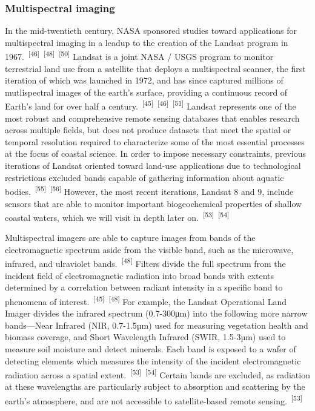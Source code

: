 \documentclass{article}
\begin{document}
\subsubsection{Multispectral imaging}


\par{In the mid-twentieth century, NASA sponsored studies toward applications for multispectral imaging in a leadup to the creation of the Landsat program in 1967.~\textsuperscript{[46]}~\textsuperscript{[48]}~\textsuperscript{[50]} Landsat is a joint NASA / USGS program to monitor terrestrial land use from a satellite that deploys a multispectral scanner, the first iteration of which was launched in 1972, and has since captured millions of mutlispectral images of the earth's surface, providing a continuous record of Earth's land for over half a century.~\textsuperscript{[45]}~\textsuperscript{[46]}~\textsuperscript{[51]} Landsat represents one of the most robust and comprehensive remote sensing databases that enables research across multiple fields, but does not produce datasets that meet the spatial or temporal resolution required to characterize some of the most essential processes at the focus of coastal science. In order to impose necessary constraints, previous iterations of Landsat oriented toward land-use applications due to technological restrictions excluded bands capable of gathering information about aquatic bodies.~\textsuperscript{[55]}~\textsuperscript{[56]} However, the most recent iterations, Landsat 8 and 9, include sensors that are able to monitor important biogeochemical properties of shallow coastal waters, which we will visit in depth later on.~\textsuperscript{[53]}~\textsuperscript{[54]}}


\par{Multispectral imagers are able to capture images from bands of the electromagnetic spectrum aside from the visible band, such as the microwave, infrared, and ulraviolet bands.~\textsuperscript{[48]} Filters divide the full spectrum from the incident field of electromagnetic radiation into broad bands with extents determined by a correlation between radiant intensity in a specific band to phenomena of interest.~\textsuperscript{[45]}~\textsuperscript{[48]} For example, the Landsat Operational Land Imager divides the infrared spectrum (0.7-300μm) into the following more narrow bands---Near Infrared (NIR, 0.7-1.5µm) used for measuring vegetation health and biomass coverage, and Short Wavelength Infrared (SWIR, 1.5-3µm) used to measure soil moisture and detect minerals. Each band is exposed to a wafer of detecting elements which measures the intensity of the incident electromagnetic radiation across a spatial extent.~\textsuperscript{[53]}~\textsuperscript{[54]} Certain bands are excluded, as radiation at these wavelengths are particularly subject to absorption and scattering by the earth's atmosphere, and are not accessible to satellite-based remote sensing.~\textsuperscript{[53]}}
\end{document}
